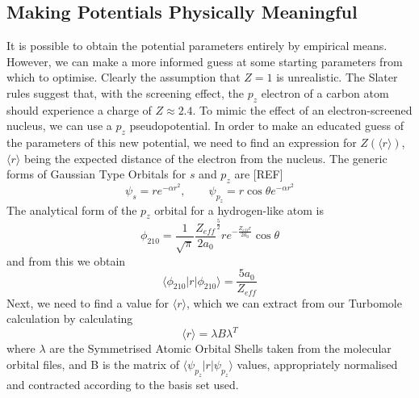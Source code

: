 \documentclass[journal=jctcce,manuscript=article]{achemso}
\begin{document}
\subsection{Making Potentials Physically Meaningful}
\label{section:potential_derivation}

It is possible to obtain the potential parameters entirely by empirical means. However, we can make a more informed guess at some starting parameters from which to optimise. Clearly the assumption that \(Z = 1\) is unrealistic. The Slater rules suggest that, with the screening effect, the \(p_{z}\) electron of a carbon atom should experience a charge of \(Z \approx 2.4\). To mimic the effect of an electron-screened nucleus, we can use a \(p_{z}\) pseudopotential. In order to make an educated guess of the parameters of this new potential, we need to find an expression for \(Z(\langle r \rangle)\), \( \langle r \rangle \) being the expected distance of the electron from the nucleus.
	The generic forms of Gaussian Type Orbitals for \(s\) and \(p_{z}\) are [REF]
\begin{equation}
\psi_{s} = re^{-\alpha r^{2}},\qquad	\psi_{p_{z}} = r \cos \theta e^{-\alpha r^{2}}
\end{equation}
The analytical form of the \(p_{z}\) orbital for a hydrogen-like atom is\cite{nyu_h_solutions}
\begin{equation}
\phi_{210} = \frac{1}{\sqrt{\pi}} \frac{Z_{eff}}{2a_{0}} ^{\frac{5}{2}} re^{-\frac{Z_{eff}r}{2a_{0}}} \cos \theta
\end{equation}
and from this we obtain 
\begin{equation}
\label{equation:PsirPsi}
\langle \phi_{210} | r | \phi_{210} \rangle = \frac{5a_{0}}{Z_{eff}}
\end{equation}
Next, we need to find a value for \( \langle r \rangle \), which we can extract from our Turbomole calculation by calculating
\begin{equation}
\langle r \rangle = \lambda B \lambda^{T}
\label{equation:exp_r}
\end{equation}
where \(\lambda\) are the Symmetrised Atomic Orbital Shells taken from the molecular orbital files, and B is the matrix of \(\langle \psi_{p_{z}} | r | \psi_{p_{z}} \rangle\) values, appropriately normalised and contracted according to the basis set used.
\end{document}
